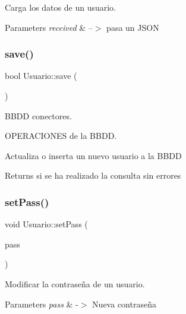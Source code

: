 Carga los datos de un usuario. 


\begin{DoxyParams}{Parameters}
{\em received} & --$>$ pasa un J\+S\+ON \\
\hline
\end{DoxyParams}
\mbox{\label{classUsuario_aa6274c43296b3fa971b5560c8a448441}} 
\subsubsection{\texorpdfstring{save()}{save()}}
{\footnotesize\ttfamily bool Usuario\+::save (\begin{DoxyParamCaption}{ }\end{DoxyParamCaption})}



B\+B\+DD conectores. 

O\+P\+E\+R\+A\+C\+I\+O\+N\+ES de la B\+B\+DD.

Actualiza o inserta un nuevo usuario a la B\+B\+DD \begin{DoxyReturn}{Returns}
si se ha realizado la consulta sin errores 
\end{DoxyReturn}
\mbox{\label{classUsuario_aa13faa50f1b4226f0c0d400911fa7c34}} 
\subsubsection{\texorpdfstring{set\+Pass()}{setPass()}}
{\footnotesize\ttfamily void Usuario\+::set\+Pass (\begin{DoxyParamCaption}\item[{Q\+String}]{pass }\end{DoxyParamCaption})}



Modificar la contraseña de un usuario. 


\begin{DoxyParams}{Parameters}
{\em pass} & -\/$>$ Nueva contraseña \\
\hline
\end{DoxyParams}
\mbox{\label{classUsuario_a7418cbad332fa68f0803f2449f304251}} 
